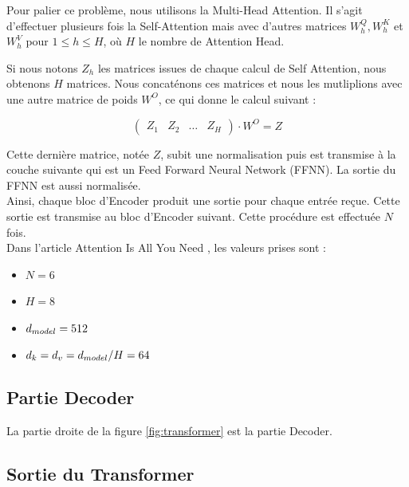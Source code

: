 Pour palier ce problème, nous utilisons la Multi-Head Attention. Il s'agit d'effectuer plusieurs fois la Self-Attention
mais avec d'autres matrices $W_h^Q, W_h^K$ et $W_h^V$ pour $1 \leq h \leq H$, où $H$ le nombre de Attention Head.

Si nous notons $Z_h$ les matrices issues de chaque calcul de Self Attention, nous obtenons $H$ matrices. Nous concaténons
ces matrices et nous les mutliplions avec une autre matrice de poids $W^O$, ce qui donne le calcul suivant :

\[  \begin{pmatrix}
    Z_1 & Z_2 & \ldots & Z_H
  \end{pmatrix}
  \cdot W^O = Z \]


Cette dernière matrice, notée $Z$, subit une normalisation puis est transmise à la couche suivante qui est un Feed Forward Neural Network (FFNN).
La sortie du FFNN est aussi normalisée. \\

Ainsi, chaque bloc d'Encoder produit une sortie pour chaque entrée reçue. Cette sortie est transmise au bloc d'Encoder suivant.
Cette procédure est effectuée $N$ fois. \\

Dans l'article \og Attention Is All You Need \fg{} \cite{vaswani2017attention}, les valeurs prises sont :

\begin{itemize}
  \item $N=6$
  \item $H=8$
  \item $d_{model} = 512$
  \item $d_k = d_v = d_{model}/H = 64$
\end{itemize}


\subsection{Partie Decoder}

La partie droite de la figure \ref{fig:transformer} est la partie Decoder.
\subsection{Sortie du Transformer}





